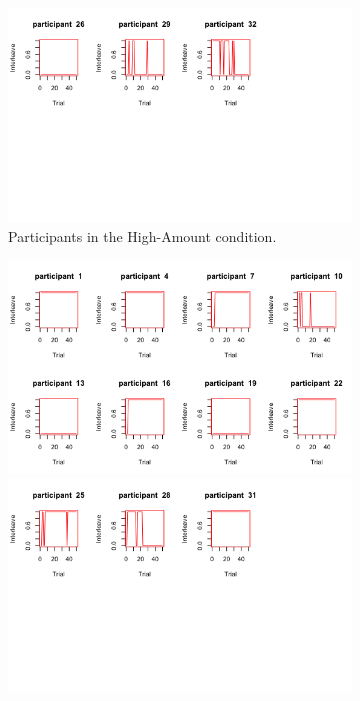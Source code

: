 \begin{figure}[!htbp]
\begin{subfigure}[b]{0.5\textwidth}
         \includegraphics[width=\textwidth]{images/ch34/ch34-4_plotHigh-Am(2).png}
        \caption{Participants in the High-Amount condition.}
    \end{subfigure}
        \begin{subfigure}[b]{0.5\textwidth}
        \includegraphics[width=\textwidth]{images/ch34/ch34-4_plotHigh-Acc(1).png}
         \includegraphics[width=\textwidth]{images/ch34/ch34-4_plotHigh-Acc(2).png}

\end{subfigure}
\end{figure}
